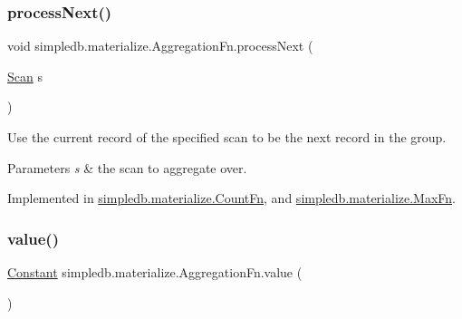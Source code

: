 \mbox{\label{interfacesimpledb_1_1materialize_1_1AggregationFn_ae2ff3fb2b1207eab18a70ecf8ffb98dc}} 
\subsubsection{\texorpdfstring{process\+Next()}{processNext()}}
{\footnotesize\ttfamily void simpledb.\+materialize.\+Aggregation\+Fn.\+process\+Next (\begin{DoxyParamCaption}\item[{\hyperlink{interfacesimpledb_1_1query_1_1Scan}{Scan}}]{s }\end{DoxyParamCaption})}

Use the current record of the specified scan to be the next record in the group. 
\begin{DoxyParams}{Parameters}
{\em s} & the scan to aggregate over. \\
\hline
\end{DoxyParams}


Implemented in \hyperlink{classsimpledb_1_1materialize_1_1CountFn_ac50cdba40eda7611ff8e015d8c305197}{simpledb.\+materialize.\+Count\+Fn}, and \hyperlink{classsimpledb_1_1materialize_1_1MaxFn_a4ce58a04c1c3891b611771630a33dc74}{simpledb.\+materialize.\+Max\+Fn}.

\mbox{\label{interfacesimpledb_1_1materialize_1_1AggregationFn_a65957d8075e508ef5555e3bf6ba16184}} 
\subsubsection{\texorpdfstring{value()}{value()}}
{\footnotesize\ttfamily \hyperlink{classsimpledb_1_1query_1_1Constant}{Constant} simpledb.\+materialize.\+Aggregation\+Fn.\+value (\begin{DoxyParamCaption}{ }\end{DoxyParamCaption})}

